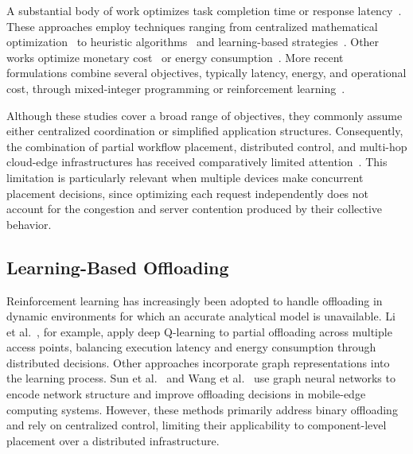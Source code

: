 A substantial body of work optimizes task completion time or response
latency~\cite{DBLP:journals/tcc/GuoYZC22,DBLP:conf/infocom/MengTXCLL19,DBLP:conf/IEEEants/SarkarKM19}.
These approaches employ techniques ranging from centralized mathematical
optimization~\cite{DBLP:journals/tcc/GuoYZC22,DBLP:journals/jnca/AlkhalailehCNJ20}
to heuristic algorithms~\cite{DBLP:journals/fgcs/MiaoWLGAH20,DBLP:journals/tccn/KaiZYH21}
and learning-based strategies~\cite{DBLP:conf/IEEEants/SarkarKM19,DBLP:conf/infocom/OuyangLCZT19}.
Other works optimize monetary
cost~\cite{DBLP:conf/icdcs/Zhang0Y0Y19,DBLP:journals/ejwcn/ChabbouhRCA17,DBLP:journals/access/WangZGL20a}
or energy
consumption~\cite{DBLP:journals/tvt/ZhaoLGZ19,DBLP:journals/jsac/ChengLQZHSS19,DBLP:journals/twc/TiVLS20}.
More recent formulations combine several objectives, typically latency, energy,
and operational cost, through mixed-integer programming or reinforcement
learning~\cite{DBLP:journals/ejwcn/LongLZLH20,DBLP:journals/access/KhayyatEMAAK20}.

Although these studies cover a broad range of objectives, they commonly assume
either centralized coordination or simplified application structures.
Consequently, the combination of partial workflow placement, distributed control,
and multi-hop cloud-edge infrastructures has received comparatively limited
attention~\cite{DBLP:journals/access/WangWHSQ20}.
This limitation is particularly relevant when multiple devices make concurrent
placement decisions, since optimizing each request independently does not account
for the congestion and server contention produced by their collective behavior.

\subsection{Learning-Based Offloading}

Reinforcement learning has increasingly been adopted to handle offloading in
dynamic environments for which an accurate analytical model is unavailable.
Li et al.~\cite{Li2021PartialOffloadingDQN}, for example, apply deep Q-learning to
partial offloading across multiple access points, balancing execution latency and
energy consumption through distributed decisions.
Other approaches incorporate graph representations into the learning process.
Sun et al.~\cite{Sun2021GraphRL} and Wang et al.~\cite{Wang2024MGNRL} use graph
neural networks to encode network structure and improve offloading decisions in
mobile-edge computing systems.
However, these methods primarily address binary offloading and rely on centralized
control, limiting their applicability to component-level placement over a
distributed infrastructure.

